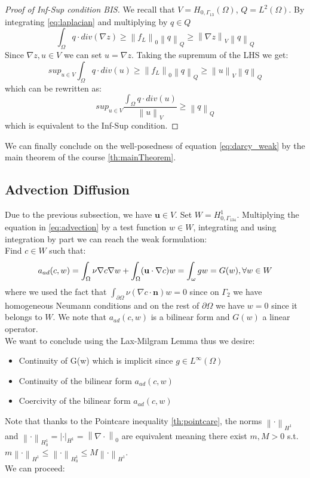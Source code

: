 \documentclass[conference]{IEEEtran}
\newcommand{\norm}[1]{\left\lVert#1\right\rVert}
\begin{document}
\begin{proof}[Proof of Inf-Sup condition BIS]
\label{proof:InfSupBis}
We recall that $V=H_{0,\Gamma_{13}}(\Omega)$, $Q=L^2(\Omega)$. By integrating \ref{eq:laplacian} and multiplying by $q\in Q$ 
\begin{equation}
	\int_{\Omega} q \cdot div(\nabla z) \geq \norm{f_L}_0 \norm{q}_Q \geq \norm{\nabla z}_V \norm{q}_Q
\end{equation}
Since $\nabla z, u \in V$ we can set $u = \nabla z$. Taking the supremum of the LHS we get:
\begin{equation}
	sup_{u\in V} \int_{\Omega} q \cdot div(u) \geq \norm{f_L}_0 \norm{q}_Q \geq \norm{u}_V \norm{q}_Q
\end{equation}
which can be rewritten as:
\begin{equation}
	sup_{u\in V} \frac{ \int_{\Omega} q \cdot div(u)}{\norm{u}_V} \geq  \norm{q}_Q
\end{equation}
which is equivalent to the Inf-Sup condition.
\end{proof}

We can finally conclude on the well-posedness of equation \ref{eq:darcy_weak} by the main theorem of the course \ref{th:mainTheorem}.




\subsection{Advection Diffusion}
Due to the previous subsection, we have $\textbf{u} \in V$. Set $W= H^1_{0,\Gamma_{134}} $. Multiplying the equation in \ref{eq:advection} by a test function $w \in W$, integrating and using integration by part we can reach the weak formulation:\\
Find $c \in W$ such that:
\begin{equation}
      a_{ad}(c,w) = \int_\Omega \nu \nabla c \nabla w 
      + \int_\Omega (\textbf{u} \cdot \nabla c) w
      = \int_\omega gw = G(w),  \forall w \in W  \\
    \label{eq:advection_weak}
\end{equation}
where we used the fact that $\int_{\partial\Omega} \nu (\nabla c \cdot \textbf{n}) w = 0$ since on $\Gamma_2$ we have homogeneous Neumann conditions and on the rest of $\partial\Omega$ we have $w=0$ since it belongs to $W$. We note that $a_{ad}(c,w)$ is a bilinear form and $G(w)$ a linear operator.\\
We want to conclude using the Lax-Milgram Lemma thus we desire:
\begin{itemize}
\item Continuity of G(w) which is implicit since $g\in L^{\infty}(\Omega)$
\item Continuity of the bilinear form $a_{ad}(c,w)$
\item Coercivity of the bilinear form $a_{ad}(c,w)$
\end{itemize}
Note that thanks to the Pointcare inequality \ref{th:pointcare}, the norms $\norm{\cdot}_{H^1}$ and $\norm{\cdot}_{H^1_0}=|\cdot|_{H^1}=\norm{\nabla \cdot}_0$ are equivalent meaning there exist $m,M >0 $ s.t. $m\norm{\cdot}_{H^1} \leq \norm{\cdot}_{H^1_0} \leq M\norm{\cdot}_{H^1}$. \\
We can proceed:
\end{document}
